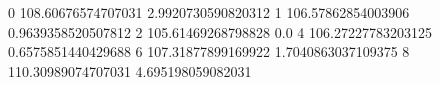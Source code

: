 0 108.60676574707031 2.9920730590820312
1 106.57862854003906 0.9639358520507812
2 105.61469268798828 0.0
4 106.27227783203125 0.6575851440429688
6 107.31877899169922 1.7040863037109375
8 110.30989074707031 4.695198059082031

